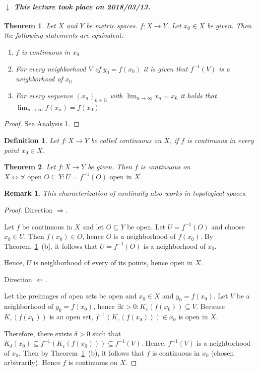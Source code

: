 \documentclass{article}
\newtheorem{theorem}{Theorem}  \numberwithin{theorem}{section}
\newtheorem{definition}{Definition}  \numberwithin{definition}{section}
\newtheorem{remark}{Remark}  \numberwithin{remark}{section}
\newcommand{\dateref}[1]{%
  \begin{mdframed}[backgroundcolor=gray!10,innerbottommargin=0pt,innertopmargin=0pt]
    \paragraph{\textit{$\downarrow$ This lecture took place on #1.}}%
  \end{mdframed}%
}
\begin{document}
\dateref{2018/03/13}

\begin{theorem} %
  \label{satz3t}
  Let $X$ and $Y$ be metric spaces. $f: X \to Y$. Let $x_0 \in X$ be given.
  Then the following statements are equivalent:
  \begin{enumerate}
    \item $f$ is continuous in $x_0$
    \item For every neighborhood $V$ of $y_0 = f(x_0)$ it is given that $f^{-1}(V)$ is a neighborhood of $x_0$
    \item For every sequence $(x_n)_{n \in \mathbb N}$ with $\lim_{n\to\infty} x_n = x_0$ it holds that $\lim_{n\to\infty} f(x_n) = f(x_0)$
  \end{enumerate}
\end{theorem}

\begin{proof}
  See Analysis 1.
\end{proof}

\begin{definition} %
  Let $f: X \to Y$ be called continuous on $X$, if $f$ is continuous in every point $x_0 \in X$.
\end{definition}

\begin{theorem} %
  Let $f: X \to Y$ be given.
  Then $f$ is continuous on $X \iff \forall \text{ open } O \subseteq Y: U = f^{-1}(O) \text{ open in } X$.
\end{theorem}

\begin{remark}
  This characterization of continuity also works in topological spaces.
\end{remark}

\begin{proof}
  Direction $\Rightarrow$.

  Let $f$ be continuous in $X$ and let $O \subseteq Y$ be open. Let $U = f^{-1}(O)$ and choose $x_0 \in U$. Then $f(x_0) \in O$, hence $O$ is a neighborhood of $f(x_0)$. By Theorem~\ref{satz3t}~(b), it follows that $U = f^{-1}(O)$ is a neighborhood of $x_0$.

  Hence, $U$ is neighborhood of every of its points, hence open in $X$.

  Direction $\Leftarrow$.

  Let the preimages of open sets be open and $x_0 \in X$ and $y_0 = f(x_0)$.
  Let $V$ be a neighborhood of $y_0 = f(x_0)$, hence $\exists \varepsilon > 0: K_{\varepsilon}(f(x_0)) \subseteq V$. Because $K_{\varepsilon}(f(x_0))$ is an open set, $f^{-1}(K_{\varepsilon}(f(x_0))) \in x_0$ is open in $X$.

  Therefore, there exists $\delta > 0$ such that $K_{\delta}(x_0) \subseteq f^{-1}(K_{\varepsilon}(f(x_0))) \subseteq f^{-1}(V)$. Hence, $f^{-1}(V)$ is a neighborhood of $x_0$. Then by Theorem~\ref{satz3t}~(b), it follows that $f$ is continuous in $x_0$ (chosen arbitrarily). Hence $f$ is continuous on $X$.
\end{proof}
\end{document}
